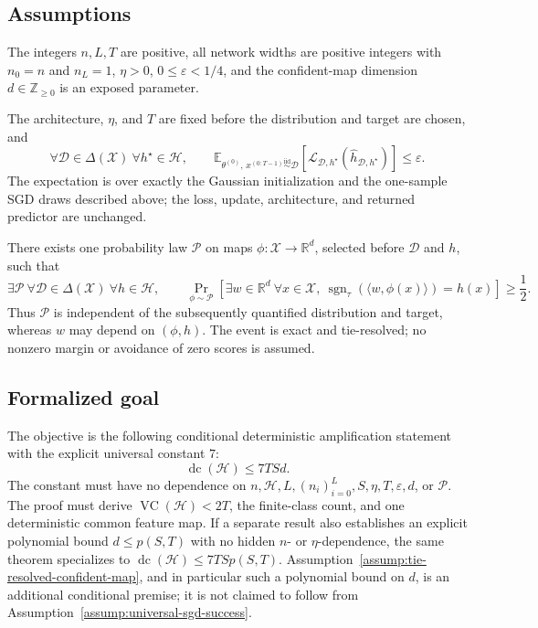 \subsection{Assumptions}

\begin{assumption}
\label{assump:source-regime}
The integers $n,L,T$ are positive, all network widths are positive integers
with $n_0=n$ and $n_L=1$, $\eta>0$, $0\leq\varepsilon<1/4$, and the
confident-map dimension $d\in\mathbb Z_{\geq0}$ is an exposed parameter.
\end{assumption}

\begin{assumption}
\label{assump:universal-sgd-success}
The architecture, $\eta$, and $T$ are fixed before the distribution and
target are chosen, and
\[
\forall\mathcal D\in\Delta(\mathcal X)\ \forall h^\star\in\mathcal H,
\qquad
\mathbb E_{\theta^{(0)},\,
x^{(0:T-1)}\stackrel{\mathrm{iid}}{\sim}\mathcal D}
\left[
\mathcal L_{\mathcal D,h^\star}
(\widehat h_{\mathcal D,h^\star})
\right]
\leq\varepsilon.
\]
The expectation is over exactly the Gaussian initialization and the one-sample
SGD draws described above; the loss, update, architecture, and returned
predictor are unchanged.
\end{assumption}

\begin{assumption}
\label{assump:tie-resolved-confident-map}
There exists one probability law $\mathcal P$ on maps
$\phi:\mathcal X\to\mathbb R^d$, selected before $\mathcal D$ and $h$, such
that
\[
\exists\mathcal P\ \forall\mathcal D\in\Delta(\mathcal X)\
\forall h\in\mathcal H,
\qquad
\Pr_{\phi\sim\mathcal P}\!\left[
\exists w\in\mathbb R^d\ \forall x\in\mathcal X,
\ \operatorname{sgn}_{\tau}(\langle w,\phi(x)\rangle)=h(x)
\right]\geq\frac12.
\]
Thus $\mathcal P$ is independent of the subsequently quantified distribution
and target, whereas $w$ may depend on $(\phi,h)$.  The event is exact and
tie-resolved; no nonzero margin or avoidance of zero scores is assumed.
\end{assumption}

\subsection{Formalized goal}

The objective is the following conditional deterministic amplification
statement with the explicit universal constant $7$:
\[
\operatorname{dc}(\mathcal H)\leq 7TSd.
\]
The constant must have no dependence on
$n,\mathcal H,L,(n_i)_{i=0}^L,S,\eta,T,\varepsilon,d$, or $\mathcal P$.
The proof must derive $\operatorname{VC}(\mathcal H)<2T$, the finite-class
count, and one deterministic common feature map.  If a separate result also
establishes an explicit polynomial bound $d\leq p(S,T)$ with no hidden
$n$- or $\eta$-dependence, the same theorem specializes to
$\operatorname{dc}(\mathcal H)\leq7TSp(S,T)$.
Assumption~\ref{assump:tie-resolved-confident-map}, and in particular such a polynomial
bound on $d$, is an additional conditional premise; it is not claimed to
follow from Assumption~\ref{assump:universal-sgd-success}.

